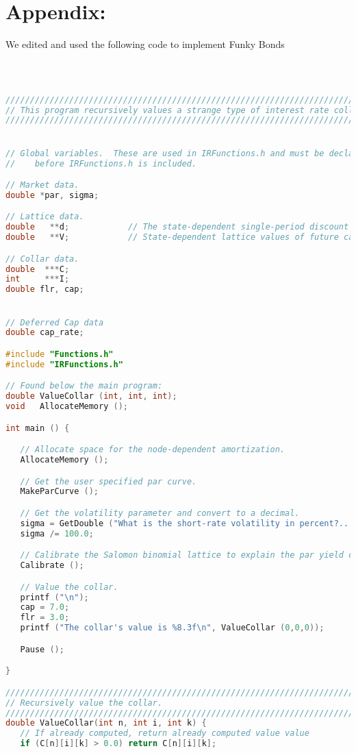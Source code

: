 \documentclass{report}
\begin{document}
\setcounter{page}{1}
\section*{Appendix:}

We edited and used the following code to implement Funky Bonds

\begin{lstlisting}[language=C++]



////////////////////////////////////////////////////////////////////////////////
// This program recursively values a strange type of interest rate collar.
////////////////////////////////////////////////////////////////////////////////


// Global variables.  These are used in IRFunctions.h and must be declared
//    before IRFunctions.h is included.

// Market data.
double *par, sigma;

// Lattice data.
double   **d;            // The state-dependent single-period discount factors.
double   **V;            // State-dependent lattice values of future cash flow.

// Collar data.
double  ***C;
int     ***I;
double flr, cap;


// Deferred Cap data
double cap_rate;

#include "Functions.h"
#include "IRFunctions.h"

// Found below the main program:
double ValueCollar (int, int, int);
void   AllocateMemory ();

int main () {

   // Allocate space for the node-dependent amortization.
   AllocateMemory ();

   // Get the user specified par curve.
   MakeParCurve ();

   // Get the volatility parameter and convert to a decimal.
   sigma = GetDouble ("What is the short-rate volatility in percent?... ");
   sigma /= 100.0;

   // Calibrate the Salomon binomial lattice to explain the par yield curve in par[].
   Calibrate ();

   // Value the collar.
   printf ("\n");
   cap = 7.0;
   flr = 3.0;
   printf ("The collar's value is %8.3f\n", ValueCollar (0,0,0));

   Pause ();

}

////////////////////////////////////////////////////////////////////////////////
// Recursively value the collar.
////////////////////////////////////////////////////////////////////////////////
double ValueCollar(int n, int i, int k) {
   // If already computed, return already computed value value
   if (C[n][i][k] > 0.0) return C[n][i][k];


\end{lstlisting}
\end{document}
